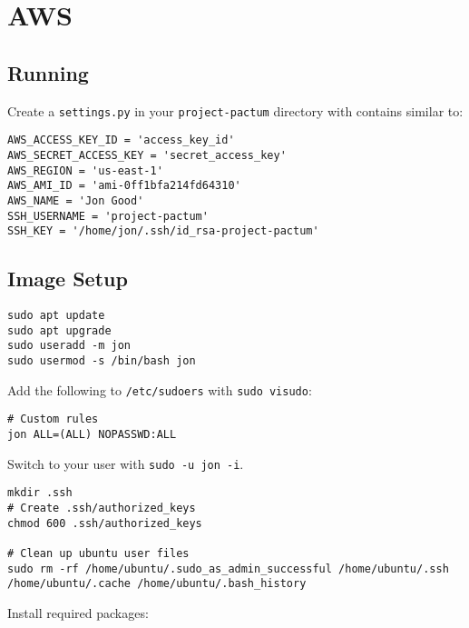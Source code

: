 \chapter{AWS}
\label{chap:aws}

\section{Running}

Create a \lstinline|settings.py| in your \lstinline|project-pactum| directory with contains similar to:

\begin{lstlisting}
AWS_ACCESS_KEY_ID = 'access_key_id'
AWS_SECRET_ACCESS_KEY = 'secret_access_key'
AWS_REGION = 'us-east-1'
AWS_AMI_ID = 'ami-0ff1bfa214fd64310'
AWS_NAME = 'Jon Good'
SSH_USERNAME = 'project-pactum'
SSH_KEY = '/home/jon/.ssh/id_rsa-project-pactum'
\end{lstlisting}

\section{Image Setup}

\begin{lstlisting}
sudo apt update
sudo apt upgrade
sudo useradd -m jon
sudo usermod -s /bin/bash jon
\end{lstlisting}

Add the following to \texttt{/etc/sudoers} with \texttt{sudo visudo}:

\begin{lstlisting}
# Custom rules
jon ALL=(ALL) NOPASSWD:ALL
\end{lstlisting}

Switch to your user with \texttt{sudo -u jon -i}.

\begin{lstlisting}
mkdir .ssh
# Create .ssh/authorized_keys
chmod 600 .ssh/authorized_keys

# Clean up ubuntu user files
sudo rm -rf /home/ubuntu/.sudo_as_admin_successful /home/ubuntu/.ssh /home/ubuntu/.cache /home/ubuntu/.bash_history
\end{lstlisting}

Install required packages:

